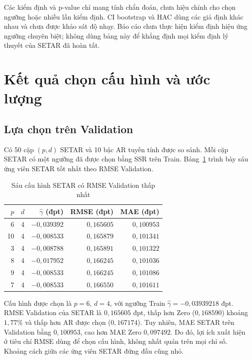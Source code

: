 \documentclass[a4paper,reqno,oneside]{book}
\numberwithin{equation}{chapter}
\begin{document}
\endgroup

Các kiểm định và p-value chỉ mang tính chẩn đoán, chưa hiệu chỉnh cho chọn ngưỡng hoặc nhiều lần kiểm định. CI bootstrap và HAC dùng các giả định khác nhau và chưa được khảo sát độ nhạy. Báo cáo chưa thực hiện kiểm định hiệu ứng ngưỡng chuyên biệt; không dùng bảng này để khẳng định mọi kiểm định lý thuyết của SETAR đã hoàn tất.

\section{Kết quả chọn cấu hình và ước lượng}

\subsection{Lựa chọn trên Validation}

Có 50 cặp $(p,d)$ SETAR và 10 bậc AR tuyến tính được so sánh. Mỗi cặp SETAR có một ngưỡng đã được chọn bằng SSR trên Train. Bảng~\ref{tab:setar-grid} trình bày sáu ứng viên SETAR tốt nhất theo RMSE Validation.

\begin{table}[htbp]
\centering\small
\caption{Sáu cấu hình SETAR có RMSE Validation thấp nhất}
\label{tab:setar-grid}
\begin{tabular}{rrrrr}
\toprule
$p$ & $d$ & $\widehat\gamma$ (đpt) & RMSE (đpt) & MAE (đpt) \\
\midrule
6 & 4 & $-0{,}039392$ & $0{,}165605$ & $0{,}100953$ \\
10 & 4 & $-0{,}008533$ & $0{,}165879$ & $0{,}101341$ \\
3 & 4 & $-0{,}008788$ & $0{,}165891$ & $0{,}101322$ \\
8 & 4 & $-0{,}017952$ & $0{,}166245$ & $0{,}101036$ \\
9 & 4 & $-0{,}008533$ & $0{,}166245$ & $0{,}101086$ \\
7 & 4 & $-0{,}008533$ & $0{,}166550$ & $0{,}101611$ \\
\bottomrule
\end{tabular}
\end{table}

Cấu hình được chọn là $p=6$, $d=4$, với ngưỡng Train $\widehat\gamma=-0{,}03939218$ đpt. RMSE Validation của SETAR là $0{,}165605$ đpt, thấp hơn Zero ($0{,}168590$) khoảng $1{,}77\%$ và thấp hơn AR được chọn ($0{,}167174$). Tuy nhiên, MAE SETAR trên Validation bằng $0{,}100953$, cao hơn MAE Zero $0{,}097492$. Do đó, lợi ích xuất hiện ở tiêu chí RMSE dùng để chọn cấu hình, không nhất quán trên mọi chỉ số. Khoảng cách giữa các ứng viên SETAR đứng đầu cũng nhỏ.
\end{document}
